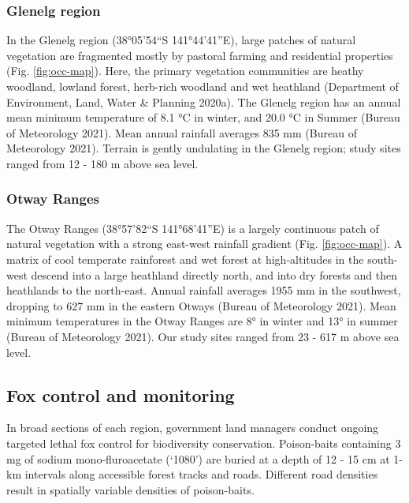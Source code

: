 \documentclass[]{elsarticle} %
\begin{document}
\hypertarget{glenelg-region}{%
\subsubsection{Glenelg region}\label{glenelg-region}}

In the Glenelg region (38°05'54``S 141°44'41''E), large patches of natural vegetation are fragmented mostly by pastoral farming and residential properties (Fig. \ref{fig:occ-map}). Here, the primary vegetation communities are heathy woodland, lowland forest, herb-rich woodland and wet heathland (Department of Environment, Land, Water \& Planning 2020a). The Glenelg region has an annual mean minimum temperature of 8.1 °C in winter, and 20.0 °C in Summer (Bureau of Meteorology 2021). Mean annual rainfall averages 835 mm (Bureau of Meteorology 2021). Terrain is gently undulating in the Glenelg region; study sites ranged from 12 - 180 m above sea level.

\hypertarget{otway-ranges}{%
\subsubsection{Otway Ranges}\label{otway-ranges}}

The Otway Ranges (38°57'82``S 141°68'41''E) is a largely continuous patch of natural vegetation with a strong east-west rainfall gradient (Fig. \ref{fig:occ-map}). A matrix of cool temperate rainforest and wet forest at high-altitudes in the south-west descend into a large heathland directly north, and into dry forests and then heathlands to the north-east. Annual rainfall averages 1955 mm in the southwest, dropping to 627 mm in the eastern Otways (Bureau of Meteorology 2021). Mean minimum temperatures in the Otway Ranges are 8° in winter and 13° in summer (Bureau of Meteorology 2021). Our study sites ranged from 23 - 617 m above sea level.

\hypertarget{fox-control-and-monitoring}{%
\subsection{Fox control and monitoring}\label{fox-control-and-monitoring}}

In broad sections of each region, government land managers conduct ongoing targeted lethal fox control for biodiversity conservation. Poison-baits containing 3 mg of sodium mono-fluroacetate (`1080') are buried at a depth of 12 - 15 cm at 1-km intervals along accessible forest tracks and roads. Different road densities result in spatially variable densities of poison-baits.
\end{document}
